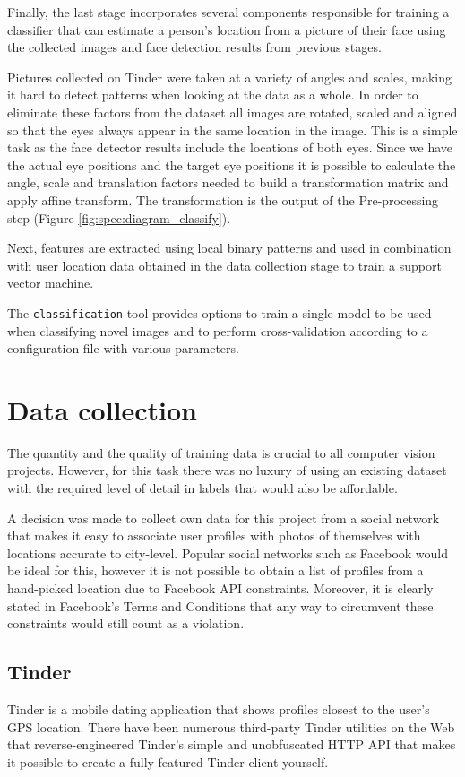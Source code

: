 Finally, the last stage incorporates several components responsible for
training a classifier that can estimate a person's location from a picture of
their face using the collected images and face detection results from previous
stages.

Pictures collected on Tinder were taken at a variety of angles and scales,
making it hard to detect patterns when looking at the data as a whole. In order
to eliminate these factors from the dataset all images are rotated, scaled and
aligned so that the eyes always appear in the same location in the image. This
is a simple task as the face detector results include the locations of both
eyes. Since we have the actual eye positions and the target eye positions it is
possible to calculate the angle, scale and translation factors needed to build
a transformation matrix and apply affine transform. The transformation is the
output of the Pre-processing step (Figure \ref{fig:spec:diagram_classify}). 

Next, features are extracted using local binary patterns and used in
combination with user location data obtained in the data collection stage to
train a support vector machine.

The \texttt{classification} tool provides options to train a single model to be
used when classifying novel images and to perform cross-validation according to
a configuration file with various parameters.


\section{Data collection}
The quantity and the quality of training data is crucial to all computer vision 
projects. However, for this task there was no luxury of using an existing 
dataset with the required level of detail in labels that would also be 
affordable.

A decision was made to collect own data for this project from a social network 
that makes it easy to associate user profiles with photos of themselves with 
locations accurate to city-level. Popular social networks such as Facebook 
would be ideal for this, however it is not possible to obtain a list of 
profiles from a hand-picked location due to Facebook API constraints. 
Moreover, it is clearly stated in Facebook's Terms and Conditions that any way 
to circumvent these constraints would still count as a violation.


\subsection{Tinder}
Tinder is a mobile dating application that shows profiles closest to the 
user's GPS location. There have been numerous third-party Tinder utilities on 
the Web that reverse-engineered Tinder's simple and unobfuscated HTTP API that 
makes it possible to create a fully-featured Tinder client yourself.

